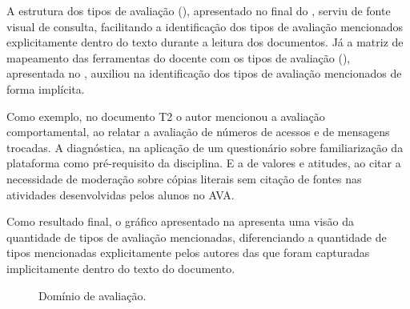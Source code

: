A estrutura dos tipos de avaliação (), apresentado no final do , serviu de fonte visual de consulta, facilitando a identificação dos tipos de avaliação mencionados explicitamente dentro do texto durante a leitura dos documentos. Já a matriz de mapeamento das ferramentas do docente com os tipos de avaliação (), apresentada no , auxiliou na identificação dos tipos de avaliação mencionados de forma implícita.

Como exemplo, no documento T2 o autor mencionou a avaliação comportamental, ao relatar a avaliação de números de acessos e de mensagens trocadas. A diagnóstica, na aplicação de um questionário sobre familiarização da plataforma como pré-requisito da disciplina. E a de valores e atitudes, ao citar a necessidade de moderação sobre cópias literais sem citação de fontes nas atividades desenvolvidas pelos alunos no AVA. 


Como resultado final, o gráfico apresentado na  apresenta uma visão da quantidade de tipos de avaliação mencionadas, diferenciando a quantidade de tipos mencionadas explicitamente pelos autores das que foram capturadas implicitamente dentro do texto do documento.

\begin{figure}[ht!]
    \centering
    \label{fig:t-aval}
    \caption{Domínio de avaliação.}
    \vspace{2mm}
\end{figure}

